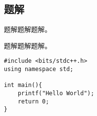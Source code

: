 \subsection{题解}
\begin{frame}
题解题解题解。
\end{frame}


\begin{frame}[fragile] %
题解题解题解。

\begin{lstlisting}[style=C++]
#include <bits/stdc++.h>
using namespace std;

int main(){
    printf("Hello World");
    return 0;
}
\end{lstlisting}
\end{frame}
